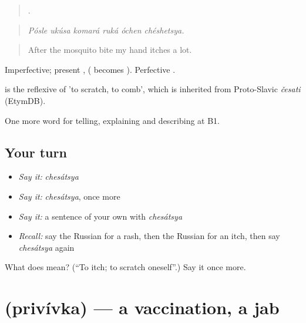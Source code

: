 \begin{quote}
     .
\end{quote}

\begin{quote}
\emph{Pósle ukúsa komará ruká óchen chéshetsya.}
\end{quote}

\begin{quote}
After the mosquito bite my hand itches a lot.
\end{quote}

Imperfective; present ,  ( becomes ). Perfective .

\begin{cousinweb}
\emph{} is the reflexive of \emph{} 'to scratch, to comb', which is inherited from Proto-Slavic \emph{česati} (EtymDB).
\end{cousinweb}

\begin{grammarlens}[title={What you've built}]
One more word for telling, explaining and describing at B1.
\end{grammarlens}

\subsection*{Your turn}
\begin{itemize}
\raggedright
  \item \emph{Say it:} \emph{chesátsya}
  \item \emph{Say it:} \emph{chesátsya}, once more
  \item \emph{Say it:} a sentence of your own with \emph{chesátsya}
  \item \emph{Recall:} say the Russian for a rash, then the Russian for an itch, then say \emph{chesátsya} again
\end{itemize}

\begin{tcolorbox}[breakable,colback=teal!4,colframe=teal!35!black,title={Before you move on}]
What does  mean? (\textquotedblleft{}To itch; to scratch oneself\textquotedblright{}.) Say it once more.
\end{tcolorbox}
\section[\texorpdfstring{\ru{прививка} (privívka)}{прививка (privívka)}]{ (privívka) — a vaccination, a jab}

